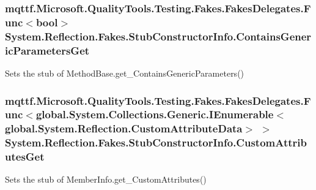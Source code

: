 \hypertarget{class_system_1_1_reflection_1_1_fakes_1_1_stub_constructor_info_a53d126a809630d4bdc8acdbf021fb789}{
\subsubsection[{Contains\-Generic\-Parameters\-Get}]{\setlength{\rightskip}{0pt plus 5cm}mqttf.\-Microsoft.\-Quality\-Tools.\-Testing.\-Fakes.\-Fakes\-Delegates.\-Func$<$bool$>$ System.\-Reflection.\-Fakes.\-Stub\-Constructor\-Info.\-Contains\-Generic\-Parameters\-Get}}\label{class_system_1_1_reflection_1_1_fakes_1_1_stub_constructor_info_a53d126a809630d4bdc8acdbf021fb789}


Sets the stub of Method\-Base.\-get\-\_\-\-Contains\-Generic\-Parameters()

\hypertarget{class_system_1_1_reflection_1_1_fakes_1_1_stub_constructor_info_a8c3e7f272756c60d11d5d567b5dee18e}{
\subsubsection[{Custom\-Attributes\-Get}]{\setlength{\rightskip}{0pt plus 5cm}mqttf.\-Microsoft.\-Quality\-Tools.\-Testing.\-Fakes.\-Fakes\-Delegates.\-Func$<$global.\-System.\-Collections.\-Generic.\-I\-Enumerable$<$global.\-System.\-Reflection.\-Custom\-Attribute\-Data$>$ $>$ System.\-Reflection.\-Fakes.\-Stub\-Constructor\-Info.\-Custom\-Attributes\-Get}}\label{class_system_1_1_reflection_1_1_fakes_1_1_stub_constructor_info_a8c3e7f272756c60d11d5d567b5dee18e}


Sets the stub of Member\-Info.\-get\-\_\-\-Custom\-Attributes()

